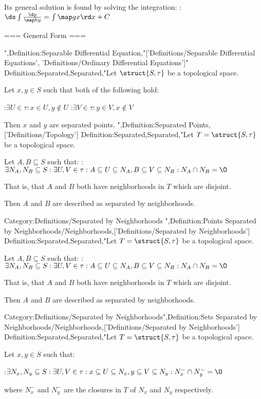 Its general solution is found by solving the integration:
:$\ds \int \frac {\d y} {\map h y} = \int \map g x \rd x + C$


=== General Form ===

",Definition:Separable Differential Equation,"['Definitions/Separable Differential Equations', 'Definitions/Ordinary Differential Equations']"
Definition:Separated,Separated,"Let $\struct {S, \tau}$ be a topological space.

Let $x, y \in S$ such that both of the following hold:

:$\exists U \in \tau: x \in U, y \notin U$
:$\exists V \in \tau: y \in V, x \notin V$


Then $x$ and $y$ are separated points.
",Definition:Separated Points,['Definitions/Topology']
Definition:Separated,Separated,"Let $T = \struct {S, \tau}$ be a topological space.


Let $A, B \subseteq S$ such that:
:$\exists N_A, N_B \subseteq S: \exists U, V \in \tau: A \subseteq U \subseteq N_A, B \subseteq V \subseteq N_B: N_A \cap N_B = \O$


That is, that $A$ and $B$ both have neighborhoods in $T$ which are disjoint.


Then $A$ and $B$ are described as separated by neighborhoods.


Category:Definitions/Separated by Neighborhoods
",Definition:Points Separated by Neighborhoods/Neighborhoods,['Definitions/Separated by Neighborhoods']
Definition:Separated,Separated,"Let $T = \struct {S, \tau}$ be a topological space.


Let $A, B \subseteq S$ such that:
:$\exists N_A, N_B \subseteq S: \exists U, V \in \tau: A \subseteq U \subseteq N_A, B \subseteq V \subseteq N_B: N_A \cap N_B = \O$


That is, that $A$ and $B$ both have neighborhoods in $T$ which are disjoint.


Then $A$ and $B$ are described as separated by neighborhoods.


Category:Definitions/Separated by Neighborhoods",Definition:Sets Separated by Neighborhoods/Neighborhoods,['Definitions/Separated by Neighborhoods']
Definition:Separated,Separated,"Let $T = \struct {S, \tau}$ be a topological space.


Let $x, y \in S$ such that:

:$\exists N_x, N_y \subseteq S: \exists U, V \in \tau: x \subseteq U \subseteq N_x, y \subseteq V \subseteq N_y: N_x^- \cap N_y^- = \O$

where $N_x^-$ and $N_y^-$ are the closures in $T$ of $N_x$ and $N_y$ respectively.


